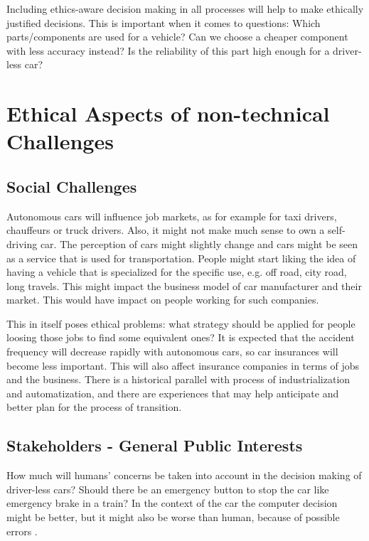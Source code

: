 Including ethics-aware decision making in all processes will help to make ethically justified decisions. This is important when it comes to questions: Which parts/components are used for a vehicle? Can we choose a cheaper component with less accuracy instead? Is the reliability of this part high enough for a driver-less car?



\section{Ethical Aspects of non-technical Challenges}
\label{sec:EAofNONTC}

\subsection{Social Challenges}
\label{sec:EAofNONTC:SocialChallenges}

Autonomous cars will influence job markets, as for example for taxi drivers, chauffeurs or truck drivers. Also, it might not make much sense to own a self-driving car. The perception of cars might slightly change and cars might be seen as a service that is used for transportation. People might start liking the idea of having a vehicle that is specialized for the specific use, e.g. off road, city road, long travels. This might impact the business model of car manufacturer and their market. This would have impact on people working for such companies.

This in itself poses ethical problems: what strategy should be applied for people loosing those jobs to find some equivalent ones? It is expected that the accident frequency will decrease rapidly with autonomous cars, so car insurances will become less important. This will also affect insurance companies in terms of jobs and the business. There is a historical parallel with process of industrialization and automatization, and there are experiences that may help anticipate and better plan for the process of transition.


\subsection{Stakeholders - General Public Interests}
\label{sec:EAofNONTC:Stakeholders}

How much will humans’ concerns be taken into account in the decision making of driver-less cars? Should there be an emergency button to stop the car like emergency brake in a train? In the context of the car the computer decision might be better, but it might also be worse than human, because of possible errors \cite{Eckstein2016}.

